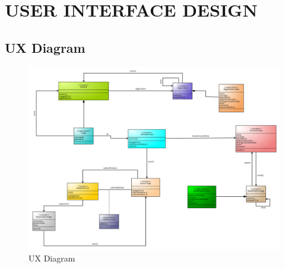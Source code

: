 \section{USER INTERFACE DESIGN}
\subsection{UX Diagram}

\begin{figure}[H]	
	\centering
	\includegraphics[width=\textwidth]{img/UX_design_document}
	\caption{UX Diagram}
\end{figure}

